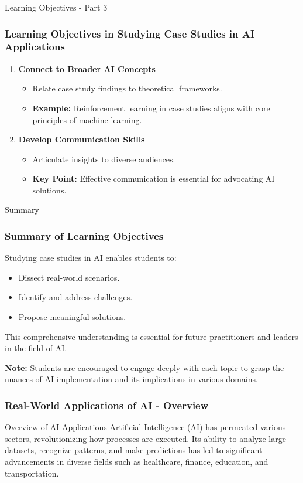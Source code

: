 \documentclass[aspectratio=169]{beamer}
\begin{document}
\begin{frame}[fragile]{Learning Objectives - Part 3}
    \frametitle{Learning Objectives in Studying Case Studies in AI Applications}
    
    \begin{enumerate}[resume]
        \item \textbf{Connect to Broader AI Concepts}
        \begin{itemize}
            \item Relate case study findings to theoretical frameworks.
            \item \textbf{Example:} Reinforcement learning in case studies aligns with core principles of machine learning.
        \end{itemize}
        
        \item \textbf{Develop Communication Skills}
        \begin{itemize}
            \item Articulate insights to diverse audiences.
            \item \textbf{Key Point:} Effective communication is essential for advocating AI solutions.
        \end{itemize}
    \end{enumerate}
\end{frame}

\begin{frame}[fragile]{Summary}
    \frametitle{Summary of Learning Objectives}
    
    Studying case studies in AI enables students to:
    \begin{itemize}
        \item Dissect real-world scenarios.
        \item Identify and address challenges.
        \item Propose meaningful solutions.
    \end{itemize}
    
    This comprehensive understanding is essential for future practitioners and leaders in the field of AI. 
    
    \textbf{Note:} Students are encouraged to engage deeply with each topic to grasp the nuances of AI implementation and its implications in various domains.
\end{frame}

\begin{frame}[fragile]
    \frametitle{Real-World Applications of AI - Overview}
    \begin{block}{Overview of AI Applications}
        Artificial Intelligence (AI) has permeated various sectors, revolutionizing how processes are executed. 
        Its ability to analyze large datasets, recognize patterns, and make predictions has led to significant advancements 
        in diverse fields such as healthcare, finance, education, and transportation.
    \end{block}
\end{frame}
\end{document}

